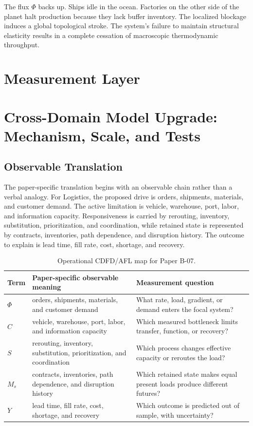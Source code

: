 \documentclass[11pt,a4paper]{article}
\begin{document}
The flux $\Phi$ backs up. Ships idle in the ocean. Factories on the other side of the planet halt production because they lack buffer inventory. The localized blockage induces a global topological stroke. The system's failure to maintain structural elasticity results in a complete cessation of macroscopic thermodynamic throughput.



\section{Measurement Layer}

\section{Cross-Domain Model Upgrade: Mechanism, Scale, and Tests}

\subsection{Observable Translation}

The paper-specific translation begins with an observable chain rather than a
verbal analogy. For Logistics, the proposed drive is orders, shipments, materials, and customer demand.
The active limitation is vehicle, warehouse, port, labor, and information capacity. Responsiveness is carried by
rerouting, inventory, substitution, prioritization, and coordination, while retained state is represented by
contracts, inventories, path dependence, and disruption history. The outcome to explain is lead time, fill rate, cost, shortage, and recovery.

\begin{table}[htbp]
\centering
\small
\caption{Operational CDFD/AFL map for Paper B-07.}
\begin{tabularx}{\textwidth}{|l|X|X|}
\hline
\textbf{Term} & \textbf{Paper-specific observable meaning} & \textbf{Measurement question} \\
\hline
$\Phi$ & orders, shipments, materials, and customer demand & What rate, load, gradient, or demand enters the focal system? \\
\hline
$C$ & vehicle, warehouse, port, labor, and information capacity & Which measured bottleneck limits transfer, function, or recovery? \\
\hline
$S$ & rerouting, inventory, substitution, prioritization, and coordination & Which process changes effective capacity or reroutes the load? \\
\hline
$M_s$ & contracts, inventories, path dependence, and disruption history & Which retained state makes equal present loads produce different futures? \\
\hline
$Y$ & lead time, fill rate, cost, shortage, and recovery & Which outcome is predicted out of sample, with uncertainty? \\
\hline
\end{tabularx}
\end{table}
\end{document}
